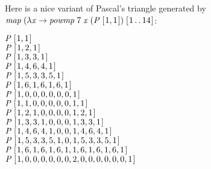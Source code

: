 \documentclass[tikz]{scrreprt}
\newcommand{\Conid}[1]{\mathit{#1}}
\newcommand{\Varid}[1]{\mathit{#1}}
\begin{document}
Here is a nice variant of Pascal's triangle generated by
\ensuremath{\Varid{map}\;(\lambda \Varid{x}\to \Varid{powmp}\;\mathrm{7}\;\Varid{x}\;(\Conid{P}\;[\mskip1.5mu \mathrm{1},\mathrm{1}\mskip1.5mu])\;[\mskip1.5mu \mathrm{1}\mathinner{\ldotp\ldotp}\mathrm{14}\mskip1.5mu]}:

\begin{minipage}{\textwidth}
\begin{center}
\ensuremath{\Conid{P}\;[\mskip1.5mu \mathrm{1},\mathrm{1}\mskip1.5mu]}\\
\ensuremath{\Conid{P}\;[\mskip1.5mu \mathrm{1},\mathrm{2},\mathrm{1}\mskip1.5mu]}\\
\ensuremath{\Conid{P}\;[\mskip1.5mu \mathrm{1},\mathrm{3},\mathrm{3},\mathrm{1}\mskip1.5mu]}\\
\ensuremath{\Conid{P}\;[\mskip1.5mu \mathrm{1},\mathrm{4},\mathrm{6},\mathrm{4},\mathrm{1}\mskip1.5mu]}\\
\ensuremath{\Conid{P}\;[\mskip1.5mu \mathrm{1},\mathrm{5},\mathrm{3},\mathrm{3},\mathrm{5},\mathrm{1}\mskip1.5mu]}\\
\ensuremath{\Conid{P}\;[\mskip1.5mu \mathrm{1},\mathrm{6},\mathrm{1},\mathrm{6},\mathrm{1},\mathrm{6},\mathrm{1}\mskip1.5mu]}\\
\ensuremath{\Conid{P}\;[\mskip1.5mu \mathrm{1},\mathrm{0},\mathrm{0},\mathrm{0},\mathrm{0},\mathrm{0},\mathrm{0},\mathrm{1}\mskip1.5mu]}\\
\ensuremath{\Conid{P}\;[\mskip1.5mu \mathrm{1},\mathrm{1},\mathrm{0},\mathrm{0},\mathrm{0},\mathrm{0},\mathrm{0},\mathrm{1},\mathrm{1}\mskip1.5mu]}\\
\ensuremath{\Conid{P}\;[\mskip1.5mu \mathrm{1},\mathrm{2},\mathrm{1},\mathrm{0},\mathrm{0},\mathrm{0},\mathrm{0},\mathrm{1},\mathrm{2},\mathrm{1}\mskip1.5mu]}\\
\ensuremath{\Conid{P}\;[\mskip1.5mu \mathrm{1},\mathrm{3},\mathrm{3},\mathrm{1},\mathrm{0},\mathrm{0},\mathrm{0},\mathrm{1},\mathrm{3},\mathrm{3},\mathrm{1}\mskip1.5mu]}\\
\ensuremath{\Conid{P}\;[\mskip1.5mu \mathrm{1},\mathrm{4},\mathrm{6},\mathrm{4},\mathrm{1},\mathrm{0},\mathrm{0},\mathrm{1},\mathrm{4},\mathrm{6},\mathrm{4},\mathrm{1}\mskip1.5mu]}\\
\ensuremath{\Conid{P}\;[\mskip1.5mu \mathrm{1},\mathrm{5},\mathrm{3},\mathrm{3},\mathrm{5},\mathrm{1},\mathrm{0},\mathrm{1},\mathrm{5},\mathrm{3},\mathrm{3},\mathrm{5},\mathrm{1}\mskip1.5mu]}\\
\ensuremath{\Conid{P}\;[\mskip1.5mu \mathrm{1},\mathrm{6},\mathrm{1},\mathrm{6},\mathrm{1},\mathrm{6},\mathrm{1},\mathrm{1},\mathrm{6},\mathrm{1},\mathrm{6},\mathrm{1},\mathrm{6},\mathrm{1}\mskip1.5mu]}\\
\ensuremath{\Conid{P}\;[\mskip1.5mu \mathrm{1},\mathrm{0},\mathrm{0},\mathrm{0},\mathrm{0},\mathrm{0},\mathrm{0},\mathrm{2},\mathrm{0},\mathrm{0},\mathrm{0},\mathrm{0},\mathrm{0},\mathrm{0},\mathrm{1}\mskip1.5mu]}
\end{center}
\end{minipage}
\end{document}
